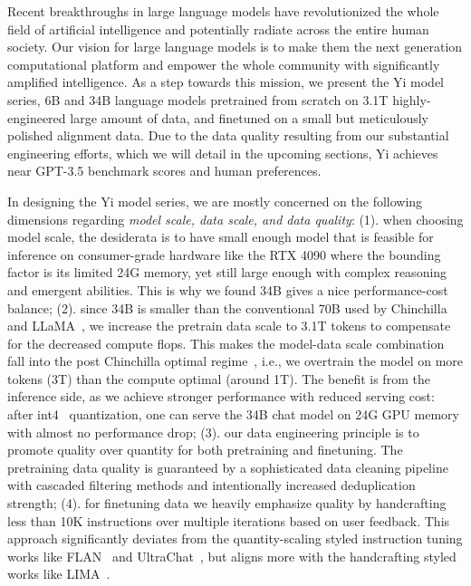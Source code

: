 
Recent breakthroughs in large language models have revolutionized the whole field of artificial intelligence and potentially radiate across the entire human society. 
Our vision for large language models is to make them the next generation computational platform and empower the whole community with significantly amplified intelligence. 
As a step towards this mission, we present the Yi model series, 6B and 34B language models pretrained from scratch on 3.1T highly-engineered large amount of data, and finetuned on a small but meticulously polished alignment data. 
Due to the data quality resulting from our substantial engineering efforts, which we will detail in the upcoming sections, Yi achieves near GPT-3.5 benchmark scores and human preferences. 

In designing the Yi model series, we are mostly concerned on the following dimensions regarding
\textit{model scale, data scale, and data quality}:
(1). when choosing model scale, the desiderata is to have small enough model that is feasible for inference on consumer-grade hardware like the RTX 4090 where the bounding factor is its limited 24G memory, yet still large enough with complex reasoning and emergent abilities. This is why we found 34B gives a nice performance-cost balance;
(2). since 34B is smaller than the conventional 70B used by Chinchilla~\citep{hoffmann2022training} and LLaMA~\citep{llama2}, we increase the pretrain data scale to 3.1T tokens to compensate for the decreased compute flops. This makes the model-data scale combination fall into the post Chinchilla optimal regime~\citep{sardana2023beyond}, i.e., we overtrain the model on more tokens (3T) than the compute optimal (around 1T). The benefit is from the inference side, as we achieve stronger performance with reduced serving cost: after int4~\citep{wu2023understanding} quantization, one can serve the 34B chat model on 24G GPU memory with almost no performance drop;
(3). our data engineering principle is to promote quality over quantity for both pretraining and finetuning.
The pretraining data quality is guaranteed by a sophisticated data cleaning pipeline with cascaded filtering methods and intentionally increased deduplication strength;
(4). for finetuning data we heavily emphasize quality by handcrafting less than 10K instructions over multiple iterations based on user feedback. This approach significantly deviates from the quantity-scaling styled instruction tuning works like FLAN~\citep{chung2022scaling} and UltraChat~\citep{ding2023enhancing}, but aligns more with the handcrafting styled works like LIMA~\citep{zhou2023lima}.

